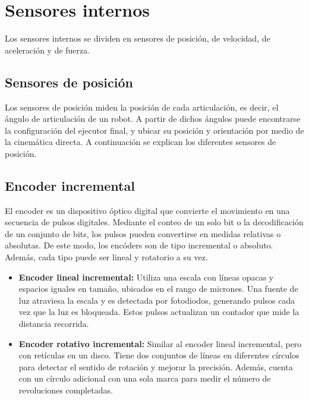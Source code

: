 \section{Sensores internos}
Los sensores internos se dividen en sensores de posición, de velocidad, de aceleración y de fuerza.

\subsection{Sensores de posición} Los sensores de posición miden la posición de cada articulación, es decir, el ángulo de articulación de un robot. A partir de dichos ángulos puede encontrarse la configuración del ejecutor final, y ubicar su posición y orientación por medio de la cinemática directa. A continuación se explican los diferentes sensores de posición.

\subsection*{Encoder incremental} El encoder es un dispositivo óptico digital que convierte el movimiento en una secuencia de pulsos digitales. Mediante el conteo de un solo bit o la decodificación de un conjunto de bits, los pulsos pueden convertirse en medidas relativas o absolutas. De este modo, los encóders son de tipo incremental o absoluto. Además, cada tipo puede ser lineal y rotatorio a su vez.

\begin{itemize}
	\item \textbf{Encoder lineal incremental:} Utiliza una escala con líneas opacas y espacios iguales en tamaño, ubicados en el rango de micrones. Una fuente de luz atraviesa la escala y es detectada por fotodiodos, generando pulsos cada vez que la luz es bloqueada. Estos pulsos actualizan un contador que mide la distancia recorrida.

	
	\item \textbf{Encoder rotativo incremental: } Similar al encoder lineal incremental, pero con retículas en un disco. Tiene dos conjuntos de líneas en diferentes círculos para detectar el sentido de rotación y mejorar la precisión. Además, cuenta con un círculo adicional con una sola marca para medir el número de revoluciones completadas.

	
\end{itemize}


